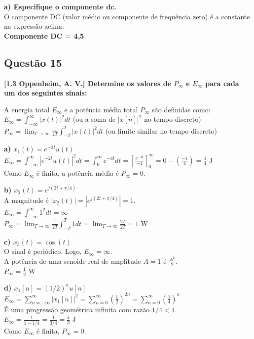 \textbf{a) Especifique o componente dc.}\\
O componente DC (valor médio ou componente de frequência zero) é a constante na expressão acima:\\
\textbf{Componente DC = 4,5}

\subsection{Questão 15}\label{questuxe3o-15}

\textbf{{[}1.3 Oppenheim, A. V.{]} Determine os valores de \(P_\infty\) e \(E_\infty\) para cada um dos seguintes sinais:}

A energia total \(E_\infty\) e a potência média total \(P_\infty\) são definidas como:\\
\(E_\infty = \int_{-\infty}^{\infty} |x(t)|^2 dt\) (ou a soma de \(|x[n]|^2\) no tempo discreto)\\
\(P_\infty = \lim_{T \to \infty} \frac{1}{2T} \int_{-T}^{T} |x(t)|^2 dt\) (ou limite similar no tempo discreto)

\textbf{a) \(x_1(t) = e^{-2t}u(t)\)}\\
\(E_\infty = \int_{-\infty}^{\infty} |e^{-2t}u(t)|^2 dt = \int_{0}^{\infty} e^{-4t} dt = \left[ \frac{e^{-4t}}{-4} \right]_0^\infty = 0 - \left( \frac{-1}{4} \right) = \frac{1}{4} \text{ J}\)\\
Como \(E_\infty\) é finita, a potência média é \(P_\infty = 0\).

\textbf{b) \(x_2(t) = e^{j(2t + \pi/4)}\)}\\
A magnitude é \(|x_2(t)| = |e^{j(2t + \pi/4)}| = 1\).\\
\(E_\infty = \int_{-\infty}^{\infty} 1^2 dt = \infty\)\\
\(P_\infty = \lim_{T \to \infty} \frac{1}{2T} \int_{-T}^{T} 1 dt = \lim_{T \to \infty} \frac{2T}{2T} = 1 \text{ W}\)

\textbf{c) \(x_3(t) = \cos(t)\)}\\
O sinal é periódico. Logo, \(E_\infty = \infty\).\\
A potência de uma senoide real de amplitude \(A=1\) é \(\frac{A^2}{2}\).\\
\(P_\infty = \frac{1}{2} \text{ W}\)

\textbf{d) \(x_1[n] = (1/2)^n u[n]\)}\\
\(E_\infty = \sum_{n=-\infty}^{\infty} |x_1[n]|^2 = \sum_{n=0}^{\infty} \left(\frac{1}{2}\right)^{2n} = \sum_{n=0}^{\infty} \left(\frac{1}{4}\right)^n\)\\
É uma progressão geométrica infinita com razão \(1/4 < 1\).\\
\(E_\infty = \frac{1}{1 - 1/4} = \frac{1}{3/4} = \frac{4}{3} \text{ J}\)\\
Como \(E_\infty\) é finita, \(P_\infty = 0\).

